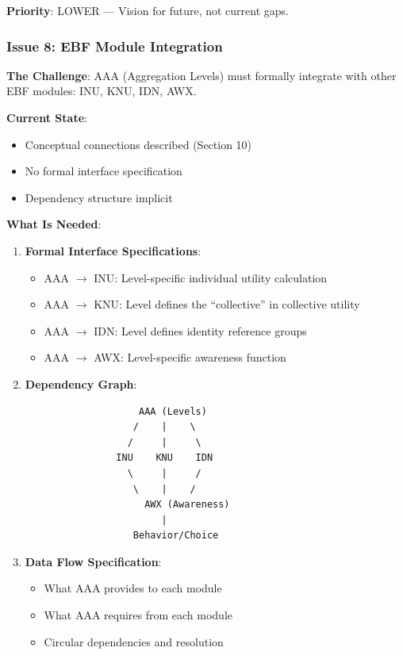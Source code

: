 \begin{tcolorbox}[colback=green!5!white, colframe=green!75!black, title=Status: Implicit Only]
\textbf{Priority}: \colorbox{green!20}{LOWER} --- Vision for future, not current gaps.
\end{tcolorbox}

\subsubsection{Issue 8: EBF Module Integration}

\begin{tcolorbox}[colback=green!5!white, colframe=green!75!black, title=Status: Informal References Only]
\textbf{The Challenge}: AAA (Aggregation Levels) must formally integrate with 
other EBF modules: INU, KNU, IDN, AWX.

\textbf{Current State}: 
\begin{itemize}[nosep]
\item Conceptual connections described (Section 10)
\item No formal interface specification
\item Dependency structure implicit
\end{itemize}

\textbf{What Is Needed}:
\begin{enumerate}
\item \textbf{Formal Interface Specifications}:
    \begin{itemize}[nosep]
    \item AAA $\rightarrow$ INU: Level-specific individual utility calculation
    \item AAA $\rightarrow$ KNU: Level defines the ``collective'' in collective utility
    \item AAA $\rightarrow$ IDN: Level defines identity reference groups
    \item AAA $\rightarrow$ AWX: Level-specific awareness function
    \end{itemize}

\item \textbf{Dependency Graph}:
\begin{verbatim}
                    AAA (Levels)
                   /    |    \
                  /     |     \
                INU    KNU    IDN
                  \     |     /
                   \    |    /
                     AWX (Awareness)
                        |
                   Behavior/Choice
\end{verbatim}

\item \textbf{Data Flow Specification}:
    \begin{itemize}[nosep]
    \item What AAA provides to each module
    \item What AAA requires from each module
    \item Circular dependencies and resolution
    \end{itemize}
\end{enumerate}


\end{tcolorbox}

